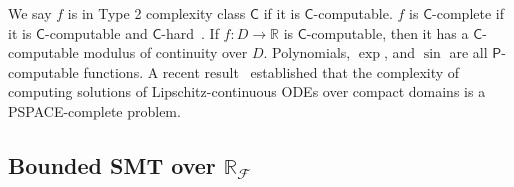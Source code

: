 \documentclass[envcountsect]{llncs}
\begin{document}
We say $f$ is in Type 2 complexity class $\mathsf{C}$ if it is $\mathsf{C}$-computable. $f$ is $\mathsf{C}$-complete if it is $\mathsf{C}$-computable and $\mathsf{C}$-hard~\cite{Kobook}. If $f:D\rightarrow \mathbb{R}$ is $\mathsf{C}$-computable, then it has a $\mathsf{C}$-computable modulus of continuity over $D$. Polynomials, $\exp$, and $\sin$ are all $\mathsf{P}$-computable functions. A recent result~\cite{Kawamura09} established that the complexity of computing solutions of Lipschitz-continuous ODEs over compact domains is a {\sf PSPACE}-complete problem. 
\subsection{Bounded SMT over $\mathbb{R}_{\mathcal{F}}$}
\end{document}
